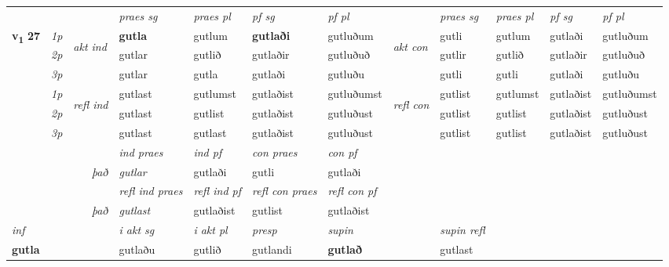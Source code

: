 \begin{longtable}[l]{X>{\footnotesize\itshape}llXXXXlXXXX}
 & &   & \textit{praes sg}  & \textit{praes pl}    & \textit{ pf sg} & \textit{pf pl} & & \textit{praes sg}  & \textit{praes pl}    & \textit{pf sg} & \textit{pf pl }  \\ \cmidrule{4-7} \cmidrule{9-12}
 \multirow{2}{*}{{{\textbf{v{\textsubscript{1}}} \Large{\textbf{27}}}}}  & 1p & \multirow{3}{*}{\begin{turn}{90}\textit{akt ind}\end{turn}} & \textbf{gutla} & gutlum & \textbf{gutlaði} & gutluðum & \multirow{3}{*}{\begin{turn}{90}\textit{akt con}\end{turn}} &gutli & gutlum & gutlaði & gutluðum\\*
 & 2p &  &  gutlar  & gutlið & gutlaðir & gutluðuð & & gutlir & gutlið & gutlaðir & gutluðuð \\*
 & 3p &  & gutlar & gutla & gutlaði & gutluðu & & gutli & gutli& gutlaði & gutluðu \\*
\cmidrule{4-7} \cmidrule{9-12}
 & 1p & \multirow{3}{*}{\begin{turn}{90}\textit{refl ind}\end{turn}}  & gutlast & gutlumst & gutlaðist & gutluðumst & \multirow{3}{*}{\begin{turn}{90}\textit{refl con}\end{turn}}  &gutlist & gutlumst & gutlaðist & gutluðumst \\*
 & 2p &  & gutlast & gutlist & gutlaðist & gutluðust & &gutlist & gutlist & gutlaðist & gutluðust \\*
 & 3p  & & gutlast & gutlast & gutlaðist & gutluðust & & gutlist & gutlist& gutlaðist & gutluðust \\*
\cmidrule{4-7} \cmidrule{9-12}

   && &  \textit{ind praes} & \textit{ind pf} & \textit{con praes} & \textit{con pf} \\*
\multicolumn{3}{r}{\textit{það}} & gutlar & gutlaði & gutli & gutlaði \\*

\cmidrule{4-7}
 & && \textit{refl ind praes} & \textit{refl ind pf} & \textit{refl con praes} & \textit{refl con pf} \\*
\multicolumn{3}{r}{\textit{það}}& gutlast & gutlaðist & gutlist & gutlaðist \\*

\cmidrule{4-7}
   {\textit{inf}} & &  & \textit{i akt sg} & \textit{i akt pl}   & \textit{presp} & \textit{supin} && \textit{supin refl}  \\*
  {\textbf{gutla}} & && gutlaðu  & gutlið   & gutlandi &  \textbf{gutlað} && gutlast  \\*


\end{longtable}

